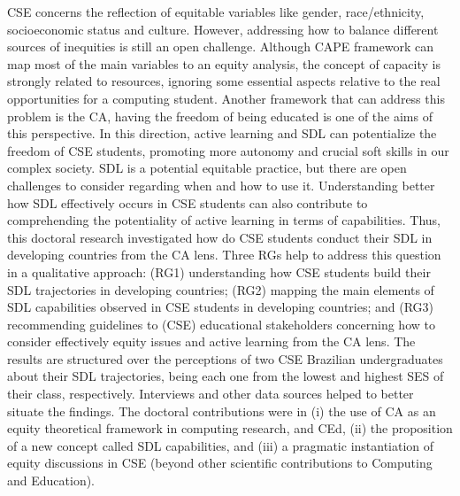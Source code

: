 


    



\begin{resumo}[Abstract]

\gls{CSE} concerns the reflection of equitable variables like gender, race/ethnicity, socioeconomic status  and culture. However, addressing how to balance different sources of inequities is still an open challenge. Although \gls{CAPE} framework can map most of the main variables to an equity analysis, the concept of capacity is strongly related to resources, ignoring some essential aspects relative to the real opportunities for a computing student. Another framework that can address this problem is the \gls{CA}, having the freedom of being educated is one of the aims of this perspective. In this direction, active learning and \gls{SDL} can potentialize the freedom of \gls{CSE} students, promoting more autonomy and crucial soft skills in our complex society. \gls{SDL} is a potential equitable practice, but there are open challenges to consider regarding when and how to use it. Understanding better how \gls{SDL} effectively occurs in \gls{CSE} students can also contribute to comprehending the potentiality of active learning in terms of capabilities. Thus, this doctoral research investigated how do \gls{CSE} students conduct their \gls{SDL} in developing countries from the \gls{CA} lens. Three \glspl{RG} help to address this question in a qualitative approach: (\gls{RG}1) understanding how \gls{CSE} students build their \gls{SDL} trajectories in developing countries; (\gls{RG}2) mapping the main elements of \gls{SDL} capabilities observed in \gls{CSE} students in developing countries; and (\gls{RG}3) recommending guidelines to (\gls{CSE}) educational stakeholders concerning how to consider effectively equity issues and active learning from the \gls{CA} lens.  The results are structured over the perceptions of two \gls{CSE} Brazilian undergraduates about their \gls{SDL} trajectories, being each one from the lowest and highest \gls{SES} of their class, respectively. Interviews and other data sources helped to better situate the findings. The doctoral contributions were in (i) the use of \gls{CA} as an equity theoretical framework in computing research, and \gls{CEd}, (ii) the proposition of a new concept called \gls{SDL} capabilities, and (iii) a pragmatic instantiation of equity discussions in \gls{CSE} (beyond other scientific contributions to Computing and Education).


\end{resumo}
